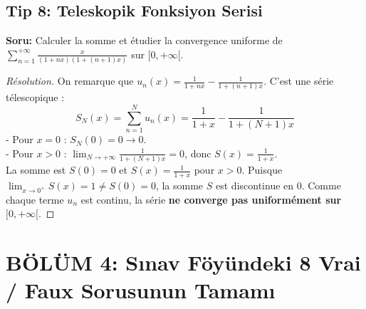 \documentclass[11pt,a4paper]{article}
\begin{document}
\subsection*{Tip 8: Teleskopik Fonksiyon Serisi}
\textbf{Soru:} Calculer la somme et étudier la convergence uniforme de $\sum_{n=1}^{+\infty} \frac{x}{(1+nx)(1+(n+1)x)}$ sur $[0, +\infty[$.
\begin{proof}[Résolution]
On remarque que $u_n(x) = \frac{1}{1+nx} - \frac{1}{1+(n+1)x}$. C'est une série télescopique :
\[ S_N(x) = \sum_{n=1}^N u_n(x) = \frac{1}{1+x} - \frac{1}{1+(N+1)x} \]
- Pour $x = 0$ : $S_N(0) = 0 \to 0$.\\
- Pour $x > 0$ : $\lim_{N \to +\infty} \frac{1}{1+(N+1)x} = 0$, donc $S(x) = \frac{1}{1+x}$.\\
La somme est $S(0) = 0$ et $S(x) = \frac{1}{1+x}$ pour $x > 0$.
Puisque $\lim_{x \to 0^+} S(x) = 1 \neq S(0) = 0$, la somme $S$ est discontinue en 0. Comme chaque terme $u_n$ est continu, la série \textbf{ne converge pas uniformément sur $[0, +\infty[$}.
\end{proof}

\newpage

\section*{BÖLÜM 4: Sınav Föyündeki 8 Vrai / Faux Sorusunun Tamamı}
\end{document}
